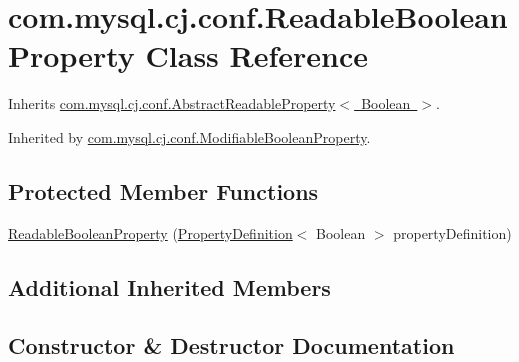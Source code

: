 \hypertarget{classcom_1_1mysql_1_1cj_1_1conf_1_1_readable_boolean_property}{}\section{com.\+mysql.\+cj.\+conf.\+Readable\+Boolean\+Property Class Reference}
\label{classcom_1_1mysql_1_1cj_1_1conf_1_1_readable_boolean_property}


Inherits \mbox{\hyperlink{classcom_1_1mysql_1_1cj_1_1conf_1_1_abstract_readable_property}{com.\+mysql.\+cj.\+conf.\+Abstract\+Readable\+Property$<$ Boolean $>$}}.



Inherited by \mbox{\hyperlink{classcom_1_1mysql_1_1cj_1_1conf_1_1_modifiable_boolean_property}{com.\+mysql.\+cj.\+conf.\+Modifiable\+Boolean\+Property}}.

\subsection*{Protected Member Functions}
\begin{DoxyCompactItemize}
\item 
\mbox{\hyperlink{classcom_1_1mysql_1_1cj_1_1conf_1_1_readable_boolean_property_aaa372ed3c27839f75219521766b02bdd}{Readable\+Boolean\+Property}} (\mbox{\hyperlink{interfacecom_1_1mysql_1_1cj_1_1conf_1_1_property_definition}{Property\+Definition}}$<$ Boolean $>$ property\+Definition)
\end{DoxyCompactItemize}
\subsection*{Additional Inherited Members}


\subsection{Constructor \& Destructor Documentation}
\mbox{\label{classcom_1_1mysql_1_1cj_1_1conf_1_1_readable_boolean_property_aaa372ed3c27839f75219521766b02bdd}} 
